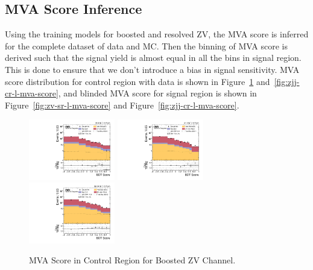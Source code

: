 \clearpage
\subsection{
  MVA Score Inference
}

Using the training models for boosted and resolved ZV, the \gls{MVA} score
is inferred for the complete dataset of data and \gls{MC}.
Then the binning of \gls{MVA} score is derived such that
the signal yield is almost equal in all the bins in signal region. This
is done to ensure that we don't introduce a bias in signal sensitivity.
\gls{MVA} score distribution for control region with
data is shown in Figure~\ref{fig:zv-cr-l-mva-score} and~\ref{fig:zjj-cr-l-mva-score},
and blinded \gls{MVA} score for signal region
is shown in Figure~\ref{fig:zv-sr-l-mva-score}
and Figure~\ref{fig:zjj-cr-l-mva-score}.

\begin{figure}[!ht]
  \centering
  \includegraphics[width=0.335\textwidth]{analysis_plots/2016_zv/cr_vjets_l/mva_score_zv_var2_log.pdf} \hspace{-10pt}
  \includegraphics[width=0.335\textwidth]{analysis_plots/2017_zv/cr_vjets_l/mva_score_zv_var2_log.pdf} \hspace{-10pt}
  \includegraphics[width=0.335\textwidth]{analysis_plots/2018_zv/cr_vjets_l/mva_score_zv_var2_log.pdf} \hspace{-10pt} \\
  \caption[MVA Score in Control Region for Boosted ZV Channel]%
  {MVA Score in Control Region for Boosted ZV Channel.}%
  \label{fig:zv-cr-l-mva-score}
\end{figure}

